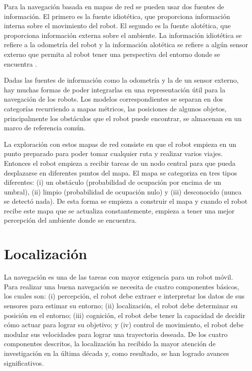 Para la navegación basada en mapas de red se pueden usar dos fuentes de 
información. El primero es la fuente idiotética, que proporciona información 
interna sobre el movimiento del robot. El segundo es la fuente alotética, que 
proporciona información externa sobre el ambiente. La información idiotética 
se refiere a la odometría del robot y la información alotética se refiere a 
algún sensor externo que permita al robot tener una perspectiva del entorno 
donde se encuentra \cite{thrun2003learning}.

Dadas las fuentes de informaci\'on como la odometr\'ia y la de un sensor 
externo, hay muchas formas de poder integrarlas en una representaci\'on útil 
para la navegaci\'on de los robots. Los modelos correspondientes se separan 
en dos categor\'ias recurriendo a mapas m\'etricos, las posiciones de algunos 
objetos, principalmente los obst\'aculos que el robot puede encontrar, se 
almacenan en un marco de referencia com\'un.

La exploraci\'on con estos mapas de red consiste en que el robot empieza en 
un punto preparado para poder tomar cualquier ruta y realizar varios 
viajes. Entonces el robot empieza a recibir tareas de un nodo central para 
que pueda desplazarse en diferentes puntos del mapa. El mapa se categoriza 
en tres tipos diferentes: (i) un obst\'aculo (probabilidad de ocupaci\'on 
por encima de un umbral), (ii) limpio (probabilidad de ocupaci\'on nulo) y 
(iii) desconocido (nunca se detectó nada). De esta forma se empieza a 
construir el mapa y cuando el robot recibe este mapa que se actualiza 
constantemente, empieza a tener una mejor percepci\'on del ambiente donde 
se encuentra.


\section{Localizaci\'on}
La navegaci\'on es una de las tareas con mayor exigencia para un robot 
móvil. Para realizar una buena navegaci\'on se necesita de cuatro componentes 
b\'asicos, los cuales son: (i) percepci\'on, el robot debe extraer e interpretar 
los datos de sus sensores para estimar su entorno; (ii) localizaci\'on, el robot 
debe determinar su posici\'on en el entorno; (iii) cognici\'on, el robot debe tener 
la capacidad de decidir c\'omo actuar para lograr su objetivo; y (iv) control de 
movimiento, el robot debe modular sus velocidades para lograr una trayectoria 
deseada. De los cuatro componentes descritos, la localizaci\'on ha recibido la 
mayor atenci\'on de investigaci\'on en la \'ultima d\'ecada y, como resultado, se 
han logrado avances significativos. %

